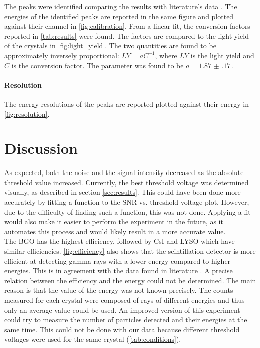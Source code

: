 \documentclass[a4paper, 11pt, table]{article}
\begin{document}
The peaks were identified comparing the results with literature's data \cite{heath_scintillation_1964}. The energies of the identified peaks are reported in the same figure and plotted against their channel in \cref{fig:calibration}. From a linear fit, the conversion factors reported in \cref{tab:results} were found. The factors are compared to the light yield of the crystals in \cref{fig:light_yield}. The two quantities are found to be approximately inversely proportional: $LY = aC^{-1}$, where $LY$ is the light yield and $C$ is the conversion factor. The parameter was found to be $a = \SI{1.87(17)}{}$.

\paragraph{Resolution} The energy resolutions of the peaks are reported plotted against their energy in \cref{fig:resolution}.

\newpage
\section{Discussion}
As expected, both the noise and the signal intensity decreased as the absolute threshold value increased. Currently, the best threshold voltage was determined visually, as described in section \ref{sec:results}. This could have been done more accurately by fitting a function to the SNR vs. threshold voltage plot. However, due to the difficulty of finding such a function, this was not done. Applying a fit would also make it easier to perform the experiment in the future, as it automates this process and would likely result in a more accurate value.\\

The BGO has the highest efficiency, followed by CsI and LYSO which have similar efficiencies. \cref{fig:efficiency} also shows that the scintillation detector is more efficient at detecting gamma rays with a lower energy compared to higher energies. This is in agreement with the data found in literature \cite{Grodzicka_2013, jeong_development_2020}. A precise relation between the efficiency and the energy could not be determined. The main reason is that the value of the energy was not known precisely. The counts measured for each crystal were composed of rays of different energies and thus only an average value could be used. An improved version of this experiment could try to measure the number of particles detected and their energies at the same time. This could not be done with our data because different threshold voltages were used for the same crystal (\cref{tab:conditions}).\\
\end{document}
